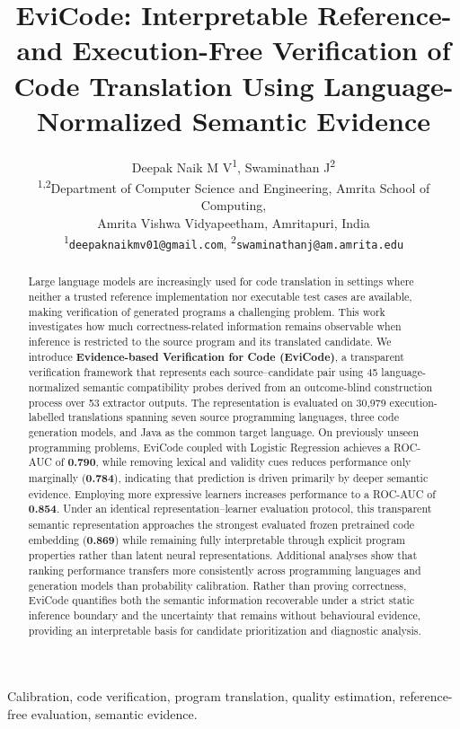 \documentclass[conference]{IEEEtran}
\title{EviCode: Interpretable Reference- and Execution-Free Verification of Code Translation Using Language-Normalized Semantic Evidence}
\author{
Deepak Naik M V\textsuperscript{1},
Swaminathan J\textsuperscript{2} \\[0.5ex]
\textsuperscript{1,2}Department of Computer Science and Engineering,
Amrita School of Computing, \\
Amrita Vishwa Vidyapeetham, Amritapuri, India \\[0.5ex]
\textsuperscript{1}\texttt{deepaknaikmv01@gmail.com},
\textsuperscript{2}\texttt{swaminathanj@am.amrita.edu}
}
\begin{document}
\maketitle

\begin{abstract}
Large language models are increasingly used for code translation in settings where neither a trusted reference implementation nor executable test cases are available, making verification of generated programs a challenging problem. This work investigates how much correctness-related information remains observable when inference is restricted to the source program and its translated candidate. We introduce \textbf{Evidence-based Verification for Code (EviCode)}, a transparent verification framework that represents each source--candidate pair using 45 language-normalized semantic compatibility probes derived from an outcome-blind construction process over 53 extractor outputs. The representation is evaluated on 30,979 execution-labelled translations spanning seven source programming languages, three code generation models, and Java as the common target language. On previously unseen programming problems, EviCode coupled with Logistic Regression achieves a ROC-AUC of \textbf{0.790}, while removing lexical and validity cues reduces performance only marginally (\textbf{0.784}), indicating that prediction is driven primarily by deeper semantic evidence. Employing more expressive learners increases performance to a ROC-AUC of \textbf{0.854}. Under an identical representation--learner evaluation protocol, this transparent semantic representation approaches the strongest evaluated frozen pretrained code embedding (\textbf{0.869}) while remaining fully interpretable through explicit program properties rather than latent neural representations. Additional analyses show that ranking performance transfers more consistently across programming languages and generation models than probability calibration. Rather than proving correctness, EviCode quantifies both the semantic information recoverable under a strict static inference boundary and the uncertainty that remains without behavioural evidence, providing an interpretable basis for candidate prioritization and diagnostic analysis.
\end{abstract}

\begin{IEEEkeywords}
Calibration, code verification, program translation, quality estimation, reference-free evaluation, semantic evidence.
\end{IEEEkeywords}
\end{document}
